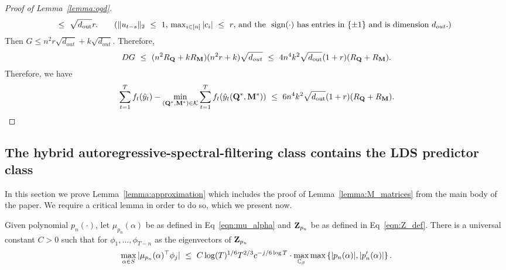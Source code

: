 \begin{proof}[Proof of Lemma~\ref{lemma:ogd}]
\begin{align*}
        & \leq \sqrt{d_{\textrm{out}}} r. \tag{$\norm{u_{t-s}}_2 \leq 1$, $\max_{i \in [n]} \abs{c_i} \leq r$, and the $\sign(\cdot)$ has entries in $\{ \pm 1 \}$ and is dimension $d_{out}$.}
    \end{align*}
    Then $G \leq n^2 r \sqrt{d_{out}} + k \sqrt{d_{out}}$. Therefore, 
    \begin{align*}
        D G ~\le~ (n^2 R_{\mathbf{Q}} + k R_{\mathbf{M}}) ( n^2 r +k) \sqrt{d_{out}} ~\le~ 4 n^4 k^2 \sqrt{d_{\textrm{out}}} (1 + r) (R_{\mathbf{Q}} + R_{\mathbf{M}}).
    \end{align*}
    Therefore, we have 
\begin{equation*}
        \sum_{t = 1}^T f_t(\hat{y}_t)  -  \min_{(\mathbf{Q}^*,\mathbf{M}^*) \in \mathcal{K}}  \sum_{t = 1}^T f_t(\hat{y}_t(\mathbf{Q}^*, \mathbf{M}^*)) ~\le~  6 n^4 k^2 \sqrt{d_{\textrm{out}}} (1 + r) (R_{\mathbf{Q}} + R_{\mathbf{M}}).
    \end{equation*}

\end{proof}


\subsection{The hybrid autoregressive-spectral-filtering class contains the LDS predictor class}
\label{appendix:M_matrices}
In this section we prove Lemma~\ref{lemma:approximation} which includes the proof of Lemma~\ref{lemma:M_matrices} from the main body of the paper. We require a critical lemma in order to do so, which we present now. 

\begin{lemma}
\label{lemma:spectral_filtering_property}
Given polynomial $p_n(\cdot)$, let $\mu_{p_n}(\alpha)$ be as defined in Eq~\eqref{eqn:mu_alpha} and $ \mathbf{Z}_{p_n} $ be as defined in Eq~\eqref{eqn:Z_def}.
There is a universal constant $C>0$ such that for $\phi_1, \dots, \phi_{T-n}$ as the eigenvectors of $\mathbf{Z}_{p_n}$
\begin{equation}
    \max_{\alpha \in S} |\mu_{p_n}(\alpha)^{\top} \phi_j| ~\le~ C \log(T)^{1/6} T^{2/3} c^{-j/6 \log T} \cdot \max_{\mathbb{C}_{\beta}} \max \left \{ |p_n(\alpha)|, |p_n'(\alpha)| \right \}.
\end{equation}
\end{lemma}

